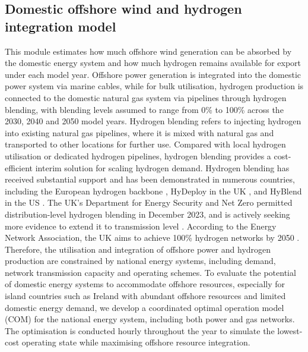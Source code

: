 \documentclass[pdflatex,lineno,sn-mathphys,Numbered]{sn-jnl}%
\begin{document}
\subsection{Domestic offshore wind and hydrogen integration model}

This module estimates how much offshore wind generation can be absorbed by the domestic energy system and how much hydrogen remains available for export under each model year.
Offshore power generation is integrated into the domestic power system via marine cables, while for bulk utilisation, hydrogen production is connected to the domestic natural gas system via pipelines through hydrogen blending, with blending levels assumed to range from 0\% to 100\% across the 2030, 2040 and 2050 model years. Hydrogen blending refers to injecting hydrogen into existing natural gas pipelines, where it is mixed with natural gas and transported to other locations for further use. Compared with local hydrogen utilisation or dedicated hydrogen pipelines, hydrogen blending provides a cost-efficient interim solution for scaling hydrogen demand. Hydrogen blending has received substantial support and has been demonstrated in numerous countries, including the European hydrogen backbone \cite{EuropeanHydrogenBackbone}, HyDeploy in the UK \cite{HyDeploy}, and HyBlend in the US \cite{HyBlend}. The UK's Department for Energy Security and Net Zero permitted distribution-level hydrogen blending in December 2023, and is actively seeking more evidence to extend it to transmission level \cite{HydrogenblendinginGB}. According to the Energy Network Association, the UK aims to achieve 100\% hydrogen networks by 2050 \cite{BritainsHydrogen}.
Therefore, the utilisation and integration of offshore power and hydrogen production are constrained by national energy systems, including demand, network transmission capacity and operating schemes. To evaluate the potential of domestic energy systems to accommodate offshore resources, especially for island countries such as Ireland with abundant offshore resources and limited domestic energy demand, we develop a coordinated optimal operation model (COM) for the national energy system, including both power and gas networks. The optimisation is conducted hourly throughout the year to simulate the lowest-cost operating state while maximising offshore resource integration.
\end{document}

